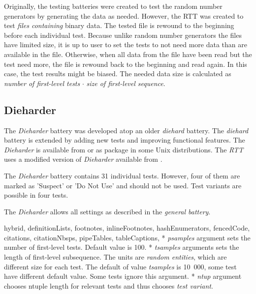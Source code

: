 \documentclass[
  digital,     %
  oneside,     %
  nosansbold,  %
  nocolorbold, %
  nolof,         %
  nolot,         %
]{fithesis4}
\begin{document}
Originally, the testing batteries were created to test the random number generators by generating the data as needed. However, the RTT was created to test \emph{files containing} binary data. The tested file is rewound to the beginning before each individual test. Because unlike random number generators the files have limited size, it is up to user to set the tests to not need more data than are available in the file. Otherwise, when all data from the file have been read but the test need more, the file is rewound back to the beginning and read again. In this case, the test results might be biased. The needed data size is calculated as \emph{number of first-level tests} $\cdot$ \emph{size of first-level sequence}.

\subsection{Dieharder} \label{chap:sols-dieharder}
The \emph{Dieharder} battery was developed atop an older \emph{diehard} battery. The \emph{diehard} battery is extended by adding new tests and improving functional features. The \emph{Dieharder} is available from \cite{dieharder_orig} or as package in some Unix distributions. The \emph{RTT} uses a modified version of \emph{Dieharder} available from \cite{rtt-batteries}.

The \emph{Dieharder} battery contains 31 individual tests. However, four of them are marked as 'Suspect' or 'Do Not Use' and should not be used. Test variants are possible in four tests.

The \emph{Dieharder} allows all settings as described in the \emph{general battery}.
\begin{markdown*}{%
  hybrid,
  definitionLists,
  footnotes,
  inlineFootnotes,
  hashEnumerators,
  fencedCode,
  citations,
  citationNbsps,
  pipeTables,
  tableCaptions,
}
* \emph{psamples} argument sets the number of first-level tests. Default value is 100.
* \emph{tsamples} arguments sets the length of first-level subsequence. The units are \emph{random entities}, which are different size for each test. The default of value \emph{tsamples} is 10~000, some test have different default value. Some tests ignore this argument.
* \emph{ntup} argument chooses ntuple length for relevant tests and thus chooses \emph{test variant}.

\end{markdown*}
\end{document}

